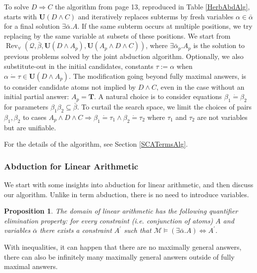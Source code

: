 \documentclass{article}
\newcommand{\assign}{:=}
\newcommand{\tmem}[1]{{\em #1\/}}
\newcommand{\tmmathbf}[1]{\ensuremath{\boldsymbol{#1}}}
\newcommand{\tmop}[1]{\ensuremath{\operatorname{#1}}}
\newtheorem{proposition}{Proposition}
\begin{document}
To solve $D \Rightarrow C$ the algorithm from {\cite{AbductionSolvMaher}}
page 13, reproduced in Table \ref{HerbAbdAlg}, starts with $\tmmathbf{U} (D
\wedge C)$ and iteratively replaces subterms by fresh variables $\alpha \in
\bar{\alpha}$ for a final solution $\exists \bar{\alpha} .A$. If the same
subterm occurs at multiple positions, we try replacing by the same variable at
subsets of these positions. We start from $\tmop{Rev}_{\forall} (\mathcal{Q},
\bar{\beta}, \tmmathbf{U} (D \wedge A_p), \tmmathbf{U} (A_p \wedge D \wedge
C))$, where $\exists \bar{\alpha}_p .A_p$ is the solution to previous problems
solved by the joint abduction algorithm. Optionally, we also substitute-out in
the initial candidates, constants $\tau \assign \alpha$ when $\alpha \dot{=}
\tau \in \tmmathbf{U} (D \wedge A_p)$. The modification going beyond fully
maximal answers, is to consider candidate atoms not implied by $D \wedge C$,
even in the case without an initial partial answer: $A_p =\tmmathbf{T}$. A
natural choice is to consider equations $\beta_1 \dot{=} \beta_2$ for
parameters $\beta_1 \beta_2 \subseteq \bar{\beta}$. To curtail the search
space, we limit the choices of pairs $\beta_1, \beta_2$ to cases $A_p \wedge D
\wedge C \Rightarrow \beta_1 \dot{=} \tau_1 \wedge \beta_2 \dot{=} \tau_2$
where $\tau_1$ and $\tau_2$ are not variables but are unifiable.

For the details of the algorithm, see Section \ref{SCATermsAlg}.

\subsubsection{Abduction for Linear Arithmetic}\label{SCANumMain}

We start with some insights into abduction for linear arithmetic, and then
discuss our algorithm. Unlike in term abduction, there is no need to introduce
variables.

\begin{proposition}
  The domain of linear arithmetic has the following {\tmem{quantifier
  elimination}} property: for every constraint (i.e. conjunction of atoms) $A$
  and variables $\bar{\alpha}$ there exists a constraint $A^{\prime}$ such
  that $\mathcal{M} \vDash (\exists \bar{\alpha} .A) \Leftrightarrow
  A^{\prime}$.
\end{proposition}

With inequalities, it can happen that there are no maximally general answers,
there can also be infinitely many maximally general answers outside of fully
maximal answers.
\end{document}
